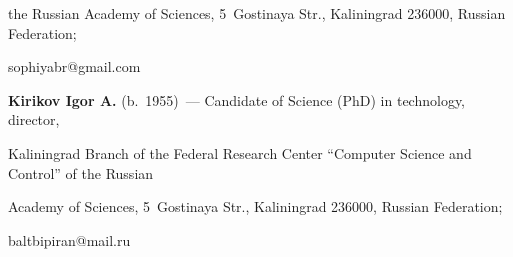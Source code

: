 the Russian Academy of Sciences, 5~Gostinaya Str., Kaliningrad 236000, Russian Federation; 

\mbox{sophiyabr@gmail.com}

   

   \vspace*{3pt}

   

   \noindent

   \textbf{Kirikov Igor A.} (b.\ 1955)~--- Candidate of Science (PhD) in technology, director, 

Kaliningrad Branch of the Federal Research Center ``Computer Science and Control'' of the Russian 

Academy of Sciences, 5~Gostinaya Str., Kaliningrad 236000, Russian Federation; 

\mbox{baltbipiran@mail.ru}

   

    

\label{end\stat}



\renewcommand{\bibname}{\protect\rm Литература} 

